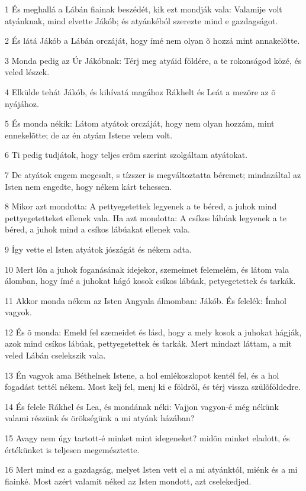 \par 1 És meghallá a Lábán fiainak beszédét, kik ezt mondják vala: Valamije volt atyánknak, mind elvette Jákób; és atyánkéból szerezte mind e gazdagságot.
\par 2 És látá Jákób a Lábán orczáját, hogy ímé nem olyan õ hozzá mint annakelõtte.
\par 3 Monda pedig az Úr Jákóbnak: Térj meg atyáid földére, a te rokonságod közé, és veled lészek.
\par 4 Elkülde tehát Jákób, és kihívatá magához Rákhelt és Leát a mezõre az õ nyájához.
\par 5 És monda nékik: Látom atyátok orczáját, hogy nem olyan hozzám, mint ennekelõtte; de az én atyám Istene velem volt.
\par 6 Ti pedig tudjátok, hogy teljes erõm szerint szolgáltam atyátokat.
\par 7 De atyátok engem megcsalt, s tízszer is megváltoztatta béremet; mindazáltal az Isten nem engedte, hogy nékem kárt tehessen.
\par 8 Mikor azt mondotta: A pettyegetettek legyenek a te béred, a juhok mind pettyegetetteket ellenek vala. Ha azt mondotta: A csíkos lábúak legyenek a te béred, a juhok mind a csíkos lábúakat ellenek vala.
\par 9 Így vette el Isten atyátok jószágát és nékem adta.
\par 10 Mert lõn a juhok foganásának idejekor, szemeimet felemelém, és látom vala álomban, hogy ímé a juhokat hágó kosok csíkos lábúak, petyegetettek és tarkák.
\par 11 Akkor monda nékem az Isten Angyala álmomban: Jákób. És felelék: Ímhol vagyok.
\par 12 És õ monda: Emeld fel szemeidet és lásd, hogy a mely kosok a juhokat hágják, azok mind csíkos lábúak, pettyegetettek és tarkák. Mert mindazt láttam, a mit veled Lábán cselekszik vala.
\par 13 Én vagyok ama Béthelnek Istene, a hol emlékoszlopot kentél fel, és a hol fogadást tettél nékem. Most kelj fel, menj ki e földrõl, és térj vissza szülõföldedre.
\par 14 És felele Rákhel és Lea, és mondának néki: Vajjon vagyon-é még nékünk valami részünk és örökségünk a mi atyánk házában?
\par 15 Avagy nem úgy tartott-é minket mint idegeneket? midõn minket eladott, és értékünket is teljesen megemésztette.
\par 16 Mert mind ez a gazdagság, melyet Isten vett el a mi atyánktól, miénk és a mi fiainké. Most azért valamit néked az Isten mondott,  azt cselekedjed.
